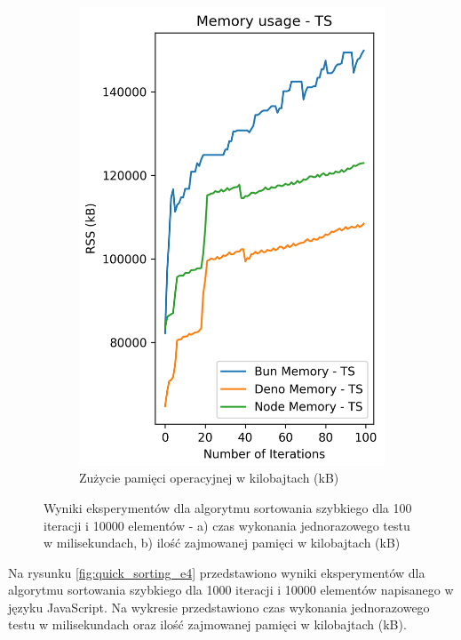 \begin{figure}[H]
\begin{subfigure}[b]{0.4\textwidth}
    \includegraphics[width=\textwidth]{Figures/sorting/sorting_quick_100_10000_ts_memory.png}
    \caption{Zużycie pamięci operacyjnej w kilobajtach (kB)}
    \label{fig:quick_sorting_e3_ts_memory}
  \end{subfigure}
  \caption{Wyniki eksperymentów dla algorytmu sortowania szybkiego dla 100 iteracji i 10000 elementów - a) czas wykonania jednorazowego testu w milisekundach, b) ilość zajmowanej pamięci w kilobajtach (kB)}
  \label{fig:quick_sorting_e3_ts}
\end{figure}

Na rysunku \ref{fig:quick_sorting_e4} przedstawiono wyniki eksperymentów dla algorytmu sortowania szybkiego dla 1000 iteracji i 10000 elementów napisanego w języku JavaScript. Na wykresie przedstawiono czas wykonania jednorazowego testu w milisekundach oraz ilość zajmowanej pamięci w kilobajtach (kB).

